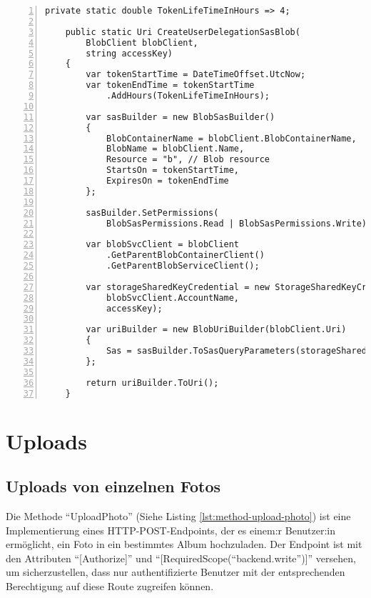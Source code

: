 \begin{lstlisting}[numbers=left,caption={SasTokenGeneratorService},label={lst:sas-token-generator-service}]
    private static double TokenLifeTimeInHours => 4;

    public static Uri CreateUserDelegationSasBlob(
        BlobClient blobClient,
        string accessKey)
    {
        var tokenStartTime = DateTimeOffset.UtcNow;
        var tokenEndTime = tokenStartTime
            .AddHours(TokenLifeTimeInHours);
        
        var sasBuilder = new BlobSasBuilder()
        {
            BlobContainerName = blobClient.BlobContainerName,
            BlobName = blobClient.Name,
            Resource = "b", // Blob resource
            StartsOn = tokenStartTime,
            ExpiresOn = tokenEndTime
        };

        sasBuilder.SetPermissions(
            BlobSasPermissions.Read | BlobSasPermissions.Write);

        var blobSvcClient = blobClient
            .GetParentBlobContainerClient()
            .GetParentBlobServiceClient();
        
        var storageSharedKeyCredential = new StorageSharedKeyCredential(
            blobSvcClient.AccountName,
            accessKey);

        var uriBuilder = new BlobUriBuilder(blobClient.Uri)
        {
            Sas = sasBuilder.ToSasQueryParameters(storageSharedKeyCredential)
        };

        return uriBuilder.ToUri();
    }
\end{lstlisting}

\section{Uploads}

\subsection{Uploads von einzelnen Fotos}

Die Methode ``UploadPhoto'' (Siehe Listing \ref{lst:method-upload-photo}) ist eine Implementierung 
eines HTTP-POST-Endpoints, der es einem:r Benutzer:in ermöglicht, ein Foto in ein bestimmtes 
Album hochzuladen. Der Endpoint ist mit den Attributen ``[Authorize]'' und 
``[RequiredScope(``backend.write'')]'' versehen, um sicherzustellen, dass nur authentifizierte 
Benutzer mit der entsprechenden Berechtigung auf diese Route zugreifen können.

